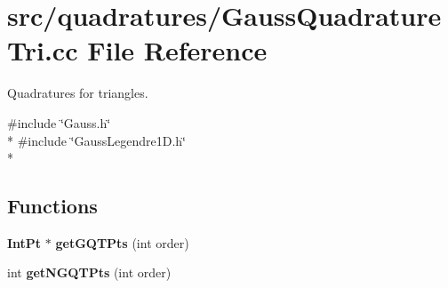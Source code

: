 \section{src/quadratures/\-Gauss\-Quadrature\-Tri.cc File Reference}
\label{GaussQuadratureTri_8cc}


Quadratures for triangles.  


{\ttfamily \#include \char`\"{}Gauss.\-h\char`\"{}}\\*
{\ttfamily \#include \char`\"{}Gauss\-Legendre1\-D.\-h\char`\"{}}\\*
\subsection*{Functions}
\begin{DoxyCompactItemize}
\item 
{\bf Int\-Pt} $\ast$ {\bfseries get\-G\-Q\-T\-Pts} (int order)\label{GaussQuadratureTri_8cc_ae8fb7deac4099c740896daf028f56b92}

\item 
int {\bfseries get\-N\-G\-Q\-T\-Pts} (int order)\label{GaussQuadratureTri_8cc_ab695c73eeb045af972383bd170d97e62}

\end{DoxyCompactItemize}

